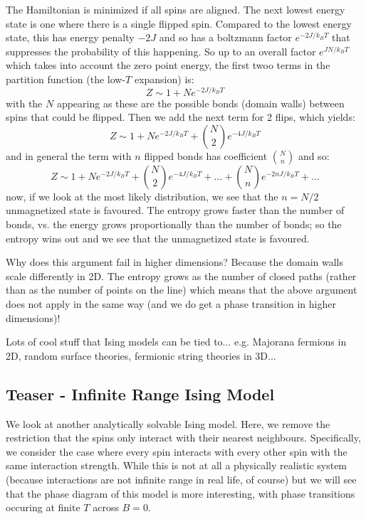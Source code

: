 The Hamiltonian is minimized if all spins are aligned. The next lowest energy state is one where there is a single flipped spin. Compared to the lowest energy state, this has energy penalty $-2J$ and so has a boltzmann factor $e^{-2J/k_B T}$ that suppresses the probability of this happening. So up to an overall factor $e^{JN/k_B T}$ which takes into account the zero point energy, the first twoo terms in the partition function (the low-$T$ expansion) is:
\begin{equation}
    Z \sim 1 + Ne^{-2J/k_B T}
\end{equation}
with the $N$ appearing as these are the possible bonds (domain walls) between spins that could be flipped. Then we add the next term for 2 flips, which yields:
\begin{equation}
    Z \sim 1+ Ne^{-2J/k_B T} + \binom{N}{2}e^{-4J/k_B T}
\end{equation}
and in general the term with $n$ flipped bonds has coefficient $\binom{N}{n}$ and so:
\begin{equation}
    Z \sim 1 + Ne^{-2J/k_B T} + \binom{N}{2}e^{-4J/k_B T} + \ldots + \binom{N}{n}e^{-2nJ/k_B T} + \ldots
\end{equation}
now, if we look at the most likely distribution, we see that the $n = N/2$ unmagnetized state is favoured. The entropy grows faster than the number of bonds, vs. the energy grows proportionally than the number of bonds; so the entropy wins out and we see that the unmagnetized state is favoured.

Why does this argument fail in higher dimensions? Because the domain walls scale differently in 2D. The entropy grows as the number of closed paths (rather than as the number of points on the line) which means that the above argument does not apply in the same way (and we do get a phase transition in higher dimensions)!

Lots of cool stuff that Ising models can be tied to... e.g. Majorana fermions in 2D, random surface theories, fermionic string theories in 3D...

\subsection{Teaser - Infinite Range Ising Model}
We look at another analytically solvable Ising model. Here, we remove the restriction that the spins only interact with their nearest neighbours. Specifically, we consider the case where every spin interacts with every other spin with the same interaction strength. While this is not at all a physically realistic system (because interactions are not infinite range in real life, of course) but we will see that the phase diagram of this model is more interesting, with phase transitions occuring at finite $T$ across $B = 0$. 

